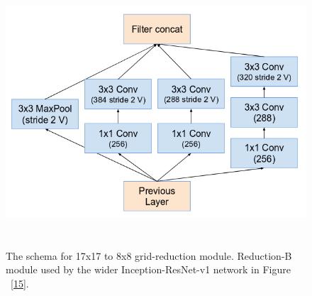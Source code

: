 \documentclass[a4paper,12pt, twoside]{NITKReport}
\begin{document}
 \begin{figure}[h]
\centering
    \includegraphics[height=10cm,width=13cm]{figure18.png}
    \caption{ The schema for 17x17 to 8x8 grid-reduction module. Reduction-B module used by the wider Inception-ResNet-v1 network in Figure ~\ref{15}.~\cite{szegedy2017inception}}
    \label{18}
 
\end{figure}
\end{document}
